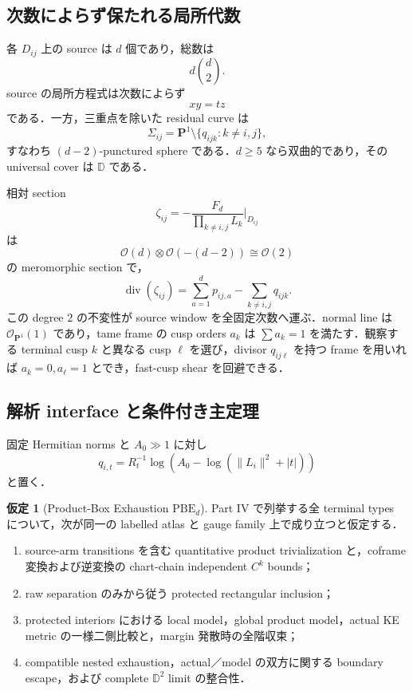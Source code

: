 \documentclass[a4paper,11pt]{ltjsarticle}
\numberwithin{equation}{section}
\theoremstyle{plain}
\theoremstyle{definition}
\newtheorem{hypothesis}[theorem]{仮定}
\theoremstyle{remark}
\newcommand{\PP}{\mathbf P}
\newcommand{\Rt}{R_t}
\begin{document}
\subsection{次数によらず保たれる局所代数}

各 \(D_{ij}\) 上の source は \(d\) 個であり，総数は
\[
 d\binom d2.
\]
source の局所方程式は次数によらず
\[
 xy=tz
\]
である．一方，三重点を除いた residual curve は
\[
 \Sigma_{ij}=\PP^1\setminus\{q_{ijk}:k\ne i,j\},
\]
すなわち \((d-2)\)-punctured sphere である．\(d\ge5\) なら双曲的であり，その universal cover は \(\mathbb D\) である．

相対 section
\begin{equation}
 \zeta_{ij}=-\frac{F_d}{\prod_{k\ne i,j}L_k}\Big|_{D_{ij}}
\label{eq:zetaij}
\end{equation}
は
\[
 \mathcal O(d)\otimes\mathcal O(-(d-2))\cong\mathcal O(2)
\]
の meromorphic section で，
\begin{equation}
 \operatorname{div}(\zeta_{ij})
 =\sum_{a=1}^d p_{ij,a}-\sum_{k\ne i,j}q_{ijk}.
\label{eq:zeta-divisor}
\end{equation}
この degree \(2\) の不変性が source window を全固定次数へ運ぶ．normal line は \(\mathcal O_{\PP^1}(1)\) であり，tame frame の cusp orders \(a_k\) は \(\sum a_k=1\) を満たす．観察する terminal cusp \(k\) と異なる cusp \(\ell\) を選び，divisor \(q_{ij\ell}\) を持つ frame を用いれば \(a_k=0,a_\ell=1\) とでき，fast-cusp shear を回避できる．

\subsection{解析 interface と条件付き主定理}

固定 Hermitian norms と \(A_0\gg1\) に対し
\begin{equation}
 q_{i,t}=\Rt^{-1}\log\!\left(A_0-\log(\|L_i\|^2+|t|)\right)
\label{eq:raw-depth}
\end{equation}
と置く．

\begin{hypothesis}[Product-Box Exhaustion \(\mathrm{PBE}_d\)]
\label{hyp:PBE}
Part IV で列挙する全 terminal types について，次が同一の labelled atlas と gauge family 上で成り立つと仮定する．
\begin{enumerate}[label=\textup{(PBE\arabic*)}]
\item source-arm transitions を含む quantitative product trivialization と，coframe 変換および逆変換の chart-chain independent \(C^k\) bounds；
\item raw separation のみから従う protected rectangular inclusion；
\item protected interiors における local model，global product model，actual KE metric の一様二側比較と，margin 発散時の全階収束；
\item compatible nested exhaustion，actual／model の双方に関する boundary escape，および complete \(\mathbb D^2\) limit の整合性．
\end{enumerate}
\end{hypothesis}
\end{document}
